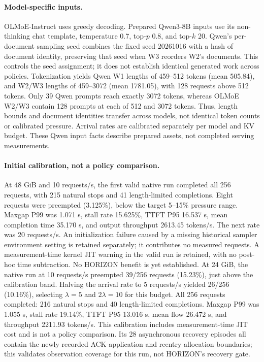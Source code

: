 \documentclass[11pt]{article}
\begin{document}
\paragraph{Model-specific inputs.}
OLMoE-Instruct uses greedy decoding. Prepared Qwen3-8B inputs use its
non-thinking chat template, temperature 0.7, top-$p$ 0.8, and top-$k$ 20.
Qwen's per-document sampling seed combines the fixed seed 20261016
with a hash of document identity, preserving that seed when W3 reorders
W2's documents. This controls the seed assignment; it does not establish
identical generated work across policies.
Tokenization yields Qwen W1 lengths of 459--512 tokens (mean 505.84),
and W2/W3 lengths of 459--3072 (mean 1781.05), with 128 requests above
512 tokens. Only 39 Qwen prompts reach exactly 3072 tokens, whereas
OLMoE W2/W3 contain 128 prompts at each of 512 and 3072 tokens.
Thus, length bounds and document identities transfer across models,
not identical token counts or calibrated pressure. Arrival rates are
calibrated separately per model and KV budget. These Qwen input facts
describe prepared assets, not completed serving measurements.

\paragraph{Initial calibration, not a policy comparison.}
At 48 GiB and 10 requests/s, the first valid native run completed all 256
requests, with 215 natural stops and 41 length-limited completions.
Eight requests were preempted (3.125\%), below the target 5--15\% pressure
range. Maxgap P99 was 1.071 s, stall rate 15.625\%, TTFT P95 16.537 s,
mean completion time 35.170 s, and output throughput 2613.45 tokens/s.
The next rate was 20 requests/s. An initialization failure caused by a missing
historical sampler environment setting is retained separately; it contributes
no measured requests. A measurement-time kernel JIT warning in the valid run
is retained, with no post-hoc time subtraction. No HORIZON benefit is yet
established.
At 24 GiB, the native run at 10 requests/s preempted 39/256 requests
(15.23\%), just above the calibration band. Halving the arrival rate to
5 requests/s yielded 26/256 (10.16\%), selecting $\lambda=5$ and
$2\lambda=10$ for this budget. All 256 requests completed: 216 natural
stops and 40 length-limited completions. Maxgap P99 was 1.055 s,
stall rate 19.14\%, TTFT P95 13.016 s, mean flow 26.472 s, and
throughput 2211.93 tokens/s. This calibration includes measurement-time
JIT cost and is not a policy comparison. Its 28 asynchronous recovery
episodes all contain the newly recorded ACK-application and reentry
allocation boundaries; this validates observation coverage for this run,
not HORIZON's recovery gate.
\end{document}
